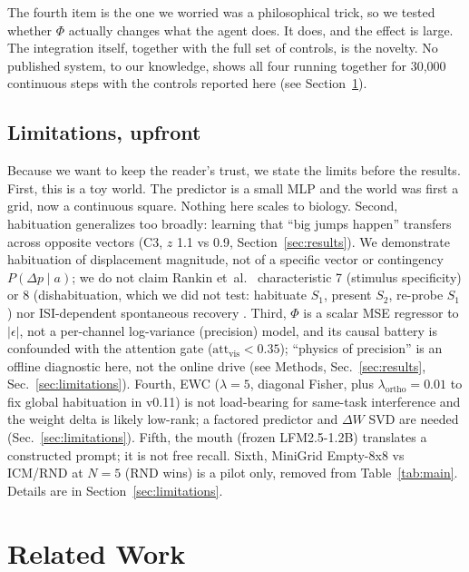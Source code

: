 \documentclass[11pt,a4paper]{article}
\begin{document}
The fourth item is the one we worried was a philosophical trick, so we tested whether $\Phi$ actually changes what the agent does. It does, and the effect is large. The integration itself, together with the full set of controls, is the novelty. No published system, to our knowledge, shows all four running together for 30,000 continuous steps with the controls reported here (see Section~\ref{sec:related}).

\subsection{Limitations, upfront}

Because we want to keep the reader's trust, we state the limits before the results. First, this is a toy world. The predictor is a small MLP and the world was first a grid, now a continuous square. Nothing here scales to biology. Second, habituation generalizes too broadly: learning that ``big jumps happen'' transfers across opposite vectors (C3, $z$ 1.1 vs 0.9, Section~\ref{sec:results}). We demonstrate habituation of displacement magnitude, not of a specific vector or contingency $P(\Delta p\mid a)$; we do not claim Rankin et~al.~\cite{rankin2009} characteristic 7 (stimulus specificity) or 8 (dishabituation, which we did not test: habituate $S_1$, present $S_2$, re-probe $S_1$) nor ISI-dependent spontaneous recovery \cite{thompson1966,rankin2009}. Third, $\Phi$ is a scalar MSE regressor to $|\epsilon|$, not a per-channel log-variance (precision) model, and its causal battery is confounded with the attention gate ($\mathrm{att}_{\mathrm{vis}}<0.35$); ``physics of precision'' is an offline diagnostic here, not the online drive (see Methods, Sec.~\ref{sec:results}, Sec.~\ref{sec:limitations}). Fourth, EWC ($\lambda=5$, diagonal Fisher, plus $\lambda_{\mathrm{ortho}}=0.01$ to fix global habituation in v0.11) is not load-bearing for same-task interference and the weight delta is likely low-rank; a factored predictor and $\Delta W$ SVD are needed (Sec.~\ref{sec:limitations}). Fifth, the mouth (frozen LFM2.5-1.2B) translates a constructed prompt; it is not free recall. Sixth, MiniGrid Empty-8x8 vs ICM/RND at $N=5$ (RND wins) is a pilot only, removed from Table~\ref{tab:main}. Details are in Section~\ref{sec:limitations}.

\section{Related Work}
\label{sec:related}
\end{document}
